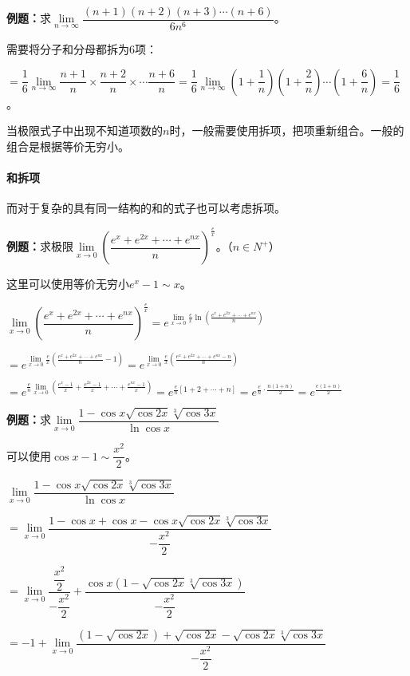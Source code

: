 \documentclass[UTF8, 12pt]{ctexart}
\begin{document}
\textbf{例题：}求$\lim\limits_{n\to\infty}\dfrac{(n+1)(n+2)(n+3)\cdots(n+6)}{6n^6}$。

需要将分子和分母都拆为6项：

$=\dfrac{1}{6}\lim\limits_{n\to\infty}\dfrac{n+1}{n}\times\dfrac{n+2}{n}\times\cdots\dfrac{n+6}{n}=\dfrac{1}{6}\lim\limits_{n\to\infty}(1+\dfrac{1}{n})(1+\dfrac{2}{n})\cdots(1+\dfrac{6}{n})=\dfrac{1}{6}$。

当极限式子中出现不知道项数的$n$时，一般需要使用拆项，把项重新组合。一般的组合是根据等价无穷小。

\paragraph{和拆项} \leavevmode \medskip

而对于复杂的具有同一结构的和的式子也可以考虑拆项。

\textbf{例题：}求极限$\lim\limits_{x\to 0}\left(\dfrac{e^x+e^{2x}+\cdots+e^{nx}}{n}\right)^{\frac{e}{x}}$。（$n\in N^+$）

这里可以使用等价无穷小$e^x-1\sim x$。

$\lim\limits_{x\to 0}\left(\dfrac{e^x+e^{2x}+\cdots+e^{nx}}{n}\right)^{\frac{e}{x}}=e^{\lim\limits_{x\to 0}\frac{e}{x}\ln\left(\frac{e^x+e^{2x}+\cdots+e^{nx}}{n}\right)}$

$=e^{\lim\limits_{x\to 0}\frac{e}{x}\left(\frac{e^x+e^{2x}+\cdots+e^{nx}}{n}-1\right)}=e^{\lim\limits_{x\to 0}\frac{e}{x}\left(\frac{e^x+e^{2x}+\cdots+e^{nx}-n}{n}\right)}$

$=e^{\frac{e}{n}\lim\limits_{x\to 0}\left(\frac{e^x-1}{x}+\frac{e^{2x}-1}{x}+\cdots+\frac{e^{nx}-1}{x}\right)}=e^{\frac{e}{n}[1+2+\cdots+n]}=e^{\frac{e}{n}\cdot\frac{n(1+n)}{2}}=e^{\frac{e(1+n)}{2}}$

\textbf{例题：}求$\lim\limits_{x\to 0}\dfrac{1-\cos x\sqrt{\cos 2x}\sqrt[3]{\cos 3x}}{\ln\cos x}$\medskip

可以使用$\cos x-1\sim\dfrac{x^2}{2}$。\medskip

$\lim\limits_{x\to 0}\dfrac{1-\cos x\sqrt{\cos 2x}\sqrt[3]{\cos 3x}}{\ln\cos x}$

$=\lim\limits_{x\to 0}\dfrac{1-\cos x+\cos x-\cos x\sqrt{\cos 2x}\sqrt[3]{\cos 3x}}{-\dfrac{x^2}{2}}$

$=\lim\limits_{x\to 0}\dfrac{\dfrac{x^2}{2}}{-\dfrac{x^2}{2}}+\dfrac{\cos x(1-\sqrt{\cos 2x}\sqrt[3]{\cos 3x})}{-\dfrac{x^2}{2}}$

$=-1+\lim\limits_{x\to 0}\dfrac{(1-\sqrt{\cos 2x})+\sqrt{\cos 2x}-\sqrt{\cos 2x}\sqrt[3]{\cos 3x}}{-\dfrac{x^2}{2}}$
\end{document}
